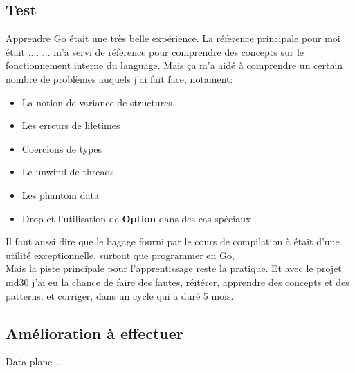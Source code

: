     \subsection{Test }
        Apprendre Go était une très belle expérience. La réference principale
        pour moi était .... 
       ... m'a servi de réference pour
        comprendre des concepts sur le fonctionnement interne du language.
     Mais ça m'a aidé à
        comprendre un certain nombre de problèmes auquels j'ai fait face, notament:
        \begin{itemize}
            \renewcommand{\labelitemi}{$\bullet$}
            \item La notion de variance de structures\cite{variance_wiki}.
            \item Les erreurs de lifetimes
            \item Coercions de types
            \item Le unwind de threads
            \item Les phantom data
            \item Drop et l'utilisation de \textbf{Option} dans des cas spéciaux
        \end{itemize}
        \bigskip
        Il faut aussi dire que le bagage fourni par le cours de compilation à
        \establishment{} était d'une utilité exceptionnelle, surtout que
        programmer en Go, \\[0.3cm]
        Mais la piste principale pour l'apprentissage reste la pratique. Et avec
        le projet \gls{md30} j'ai eu la chance de faire des fautes, réitérer,
        apprendre des concepts et des patterns, et corriger, dans un cycle qui a
        duré 5 mois. 

    \subsection{Amélioration à effectuer}
        Data plane .. 
        